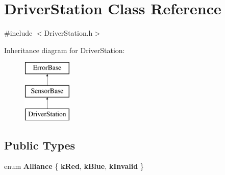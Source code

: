 \hypertarget{classDriverStation}{\section{\-Driver\-Station \-Class \-Reference}
\label{classDriverStation}
}


{\ttfamily \#include $<$\-Driver\-Station.\-h$>$}

\-Inheritance diagram for \-Driver\-Station\-:\begin{figure}[H]
\begin{center}
\leavevmode
\includegraphics[height=3.000000cm]{classDriverStation}
\end{center}
\end{figure}
\subsection*{\-Public \-Types}
\begin{DoxyCompactItemize}
\item 
enum {\bfseries \-Alliance} \{ {\bfseries k\-Red}, 
{\bfseries k\-Blue}, 
{\bfseries k\-Invalid}
 \}
\end{DoxyCompactItemize}
